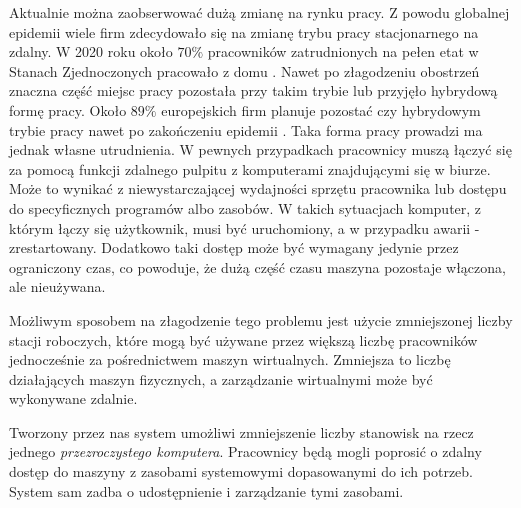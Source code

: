 \documentclass[../wstep.tex]{subfiles}
\begin{document}
Aktualnie można zaobserwować dużą zmianę na rynku pracy.
Z powodu globalnej epidemii wiele firm zdecydowało się na zmianę trybu pracy stacjonarnego na zdalny. W 2020 roku około $70\%$ pracowników zatrudnionych na pełen etat w Stanach Zjednoczonych pracowało z domu \parencite{remote-2020}.
Nawet po złagodzeniu obostrzeń znaczna część miejsc pracy pozostała przy takim trybie lub przyjęło hybrydową formę pracy. Około $89\%$ europejskich firm planuje pozostać czy hybrydowym trybie pracy nawet po zakończeniu epidemii \parencite{remote-2021}.
Taka forma pracy prowadzi ma jednak własne utrudnienia.
W pewnych przypadkach pracownicy muszą łączyć się za pomocą funkcji zdalnego pulpitu z komputerami znajdującymi się w biurze.
Może to wynikać z niewystarczającej wydajności sprzętu pracownika lub dostępu do specyficznych programów albo zasobów.
W takich sytuacjach komputer, z którym łączy się użytkownik, musi być uruchomiony, a w przypadku awarii - zrestartowany.
Dodatkowo taki dostęp może być wymagany jedynie przez ograniczony czas, co powoduje, że dużą część czasu maszyna pozostaje włączona, ale nieużywana.

Możliwym sposobem na złagodzenie tego problemu jest użycie zmniejszonej liczby stacji roboczych, które mogą być używane przez większą liczbę pracowników jednocześnie za pośrednictwem maszyn wirtualnych.
Zmniejsza to liczbę działających maszyn fizycznych, a zarządzanie wirtualnymi może być wykonywane zdalnie.

Tworzony przez nas system umożliwi zmniejszenie liczby stanowisk na rzecz jednego \textit{przezroczystego komputera}.
Pracownicy będą mogli poprosić o zdalny dostęp do maszyny z zasobami systemowymi dopasowanymi do ich potrzeb.
System sam zadba o udostępnienie i zarządzanie tymi zasobami.
\end{document}
